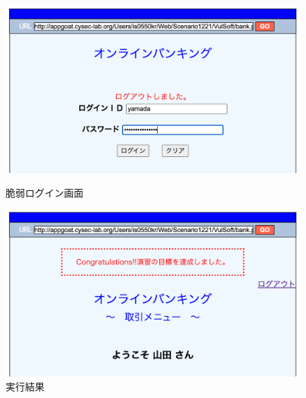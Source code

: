 \documentclass[dvipdfmx,autodetect-engine,titlepage]{jsarticle}
\begin{document}
\begin{figure}[H]
  \centering
  \begin{minipage}[b]{0.45\linewidth}
  \begin{center}
    \includegraphics[keepaspectratio,scale=0.32]{sql4.png}
    \end{center}
    \caption{脆弱ログイン画面}
  \end{minipage}
  \begin{minipage}[b]{0.45\linewidth}
  \begin{center}
    \includegraphics[keepaspectratio,scale=0.32]{sql5.png}
    \end{center}
    \caption{実行結果}
  \end{minipage}
\end{figure}

　
\end{document}
